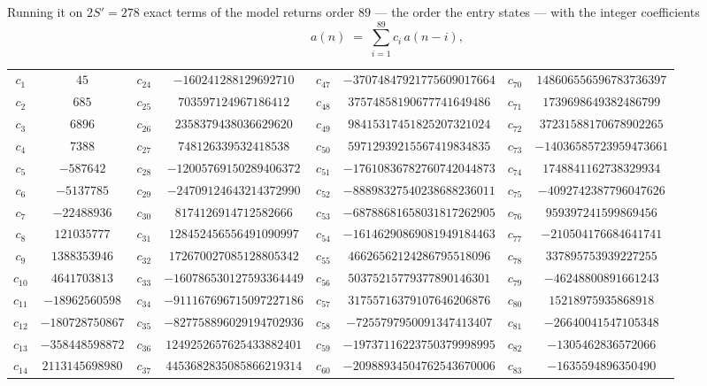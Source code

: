 \documentclass[11pt,a4paper]{article}
\theoremstyle{plain}
\theoremstyle{definition}
\begin{document}
Running it on $2S'=278$ exact terms of the model returns order $89$ --- the order the
entry states --- with the integer coefficients
\[
a(n)\;=\;\sum_{i=1}^{89}c_i\,a(n-i),
\]
\begin{center}\small
\begin{tabular}{cccccccc}
$c_{1}$ & $45$ & $c_{24}$ & $-160241288129692710$ & $c_{47}$ & $-37074847921775609017664$ & $c_{70}$ & $148606556596783736397$ \\
$c_{2}$ & $685$ & $c_{25}$ & $703597124967186412$ & $c_{48}$ & $37574858190677741649486$ & $c_{71}$ & $1739698649382486799$ \\
$c_{3}$ & $6896$ & $c_{26}$ & $2358379438036629620$ & $c_{49}$ & $98415317451825207321024$ & $c_{72}$ & $37231588170678902265$ \\
$c_{4}$ & $7388$ & $c_{27}$ & $748126339532418538$ & $c_{50}$ & $59712939215567419834835$ & $c_{73}$ & $-14036585723959473661$ \\
$c_{5}$ & $-587642$ & $c_{28}$ & $-12005769150289406372$ & $c_{51}$ & $-17610836782760742044873$ & $c_{74}$ & $1748841162738329934$ \\
$c_{6}$ & $-5137785$ & $c_{29}$ & $-24709124643214372990$ & $c_{52}$ & $-88898327540238688236011$ & $c_{75}$ & $-4092742387796047626$ \\
$c_{7}$ & $-22488936$ & $c_{30}$ & $8174126914712582666$ & $c_{53}$ & $-68788681658031817262905$ & $c_{76}$ & $959397241599869456$ \\
$c_{8}$ & $121035777$ & $c_{31}$ & $128452456556491090997$ & $c_{54}$ & $-16146290869081949184463$ & $c_{77}$ & $-210504176684641741$ \\
$c_{9}$ & $1388353946$ & $c_{32}$ & $172670027085128805342$ & $c_{55}$ & $46626562124286795518096$ & $c_{78}$ & $337895753939227255$ \\
$c_{10}$ & $4641703813$ & $c_{33}$ & $-160786530127593364449$ & $c_{56}$ & $50375215779377890146301$ & $c_{79}$ & $-46248800891661243$ \\
$c_{11}$ & $-18962560598$ & $c_{34}$ & $-911167696715097227186$ & $c_{57}$ & $31755716379107646206876$ & $c_{80}$ & $15218975935868918$ \\
$c_{12}$ & $-180728750867$ & $c_{35}$ & $-827758896029194702936$ & $c_{58}$ & $-7255797950091347413407$ & $c_{81}$ & $-26640041547105348$ \\
$c_{13}$ & $-358448598872$ & $c_{36}$ & $1249252657625433882401$ & $c_{59}$ & $-19737116223750379998995$ & $c_{82}$ & $-1305462836572066$ \\
$c_{14}$ & $2113145698980$ & $c_{37}$ & $4453682835085866219314$ & $c_{60}$ & $-20988934504762543670006$ & $c_{83}$ & $-1635594896350490$ \\

\end{tabular}
\end{center}
\end{document}

